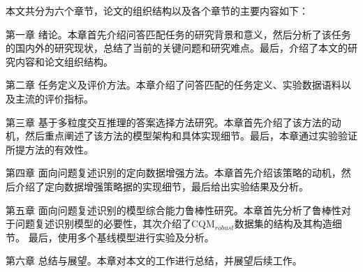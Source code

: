 本文共分为六个章节，论文的组织结构以及各个章节的主要内容如下：

第一章 \quad 绪论。本章首先介绍问答匹配任务的研究背景和意义，然后分析了该任务的国内外的研究现状，总结了当前的关键问题和研究难点。最后，介绍了本文的研究内容和论文组织结构。

第二章 \quad 任务定义及评价方法。本章介绍了问答匹配的任务定义、实验数据语料以及主流的评价指标。

第三章 \quad 基于多粒度交互推理的答案选择方法研究。本章首先介绍了该方法的动机，然后重点阐述了该方法的模型架构和具体实现细节。最后，本章通过实验验证所提方法的有效性。

第四章 \quad 面向问题复述识别的定向数据增强方法。本章首先介绍该策略的动机，然后介绍了定向数据增强策略据的实现细节，最后给出实验结果及分析。

第五章 \quad 面向问题复述识别的模型综合能力鲁棒性研究。本章首先分析了鲁棒性对于问题复述识别模型的必要性，其次介绍了CQM$_{robust}$数据集的结构及其构造细节。
最后，使用多个基线模型进行实验及分析。

第六章 \quad 总结与展望。本章对本文的工作进行总结，并展望后续工作。



